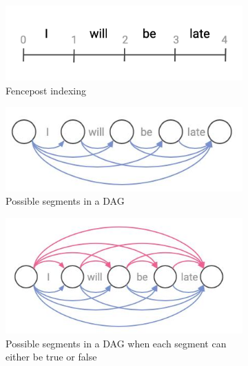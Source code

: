 \begin{figure}
    \centering
    \begin{subfigure}[b]{0.45\textwidth}
        \centering
        \includegraphics[width=\textwidth]{figs/fencepost.png}
        \caption{Fencepost indexing}
        \label{fig:fencepost}
    \end{subfigure}
    \hfill
    \begin{subfigure}[b]{0.45\textwidth}
        \centering
        \includegraphics[width=\textwidth]{figs/segmentation1.jpeg}
        \caption{Possible segments in a DAG}
        \label{fig:dag}
    \end{subfigure}
    \hfill
    \begin{subfigure}[b]{0.45\textwidth}
        \centering
        \includegraphics[width=\textwidth]{figs/segmentation2.jpeg}
        \caption{Possible segments in a DAG when each segment can either be true or false}
        \label{fig:dag2}
    \end{subfigure}
    \hfill
    \begin{subfigure}[b]{0.45\textwidth}

\end{subfigure}
\end{figure}
